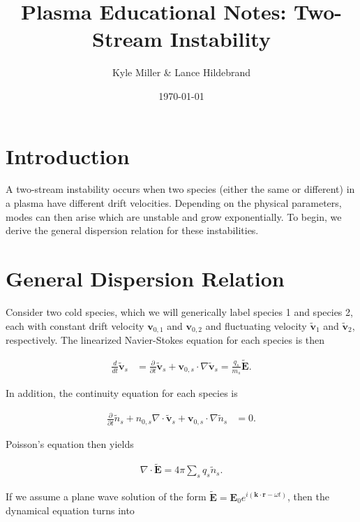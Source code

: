 \documentclass[12pt]{article}
\newcommand{\p}{\partial}
\newcommand{\mb}{\mathbf}
\begin{document}
\title{\vspace{-5ex}Plasma Educational Notes: Two-Stream Instability\vspace{-1ex}}
\date{\vspace{-1ex}\today}
\author{Kyle Miller \& Lance Hildebrand}
\maketitle

\section*{Introduction}

A two-stream instability occurs when two species (either the same or different) in a plasma have different drift velocities. Depending on the physical parameters, modes can then arise which are unstable and grow exponentially. To begin, we derive the general dispersion relation for these instabilities.

\section*{General Dispersion Relation}

Consider two cold species, which we will generically label species 1 and species 2, each with constant drift velocity $\mb{v}_{0,1}$ and $\mb{v}_{0,2}$ and fluctuating velocity $\tilde{\mb{v}}_1$ and $\tilde{\mb{v}}_2$, respectively. The linearized Navier-Stokes equation for each species is then

\begin{align*}
\frac{d}{d t} \tilde{\mb{v}}_s &= \frac{\p}{\p t} \tilde{\mb{v}}_s + \mb{v}_{0,s} \cdot \nabla \tilde{\mb{v}}_s = \frac{q_s}{m_s} \tilde{\mb{E}}.
\end{align*}

In addition, the continuity equation for each species is

\begin{align*}
\frac{\p}{\p t} \tilde{n}_s + n_{0,s} \nabla \cdot \tilde{\mb{v}}_s + \mb{v}_{0,s} \cdot \nabla \tilde{n}_s &= 0.
\end{align*}

Poisson's equation then yields

\begin{align*}
\nabla \cdot \tilde{\mb{E}} = 4\pi \sum_{s}q_s \tilde{n}_s.
\end{align*}

If we assume a plane wave solution of the form $\tilde{\mb{E}} = \mb{E}_0 e^{i(\mb{k} \cdot \mb{r} - \omega t)}$, then the dynamical equation turns into
\end{document}
